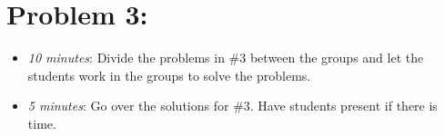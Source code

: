 \documentclass[handout,nooutcomes]{ximera}
\begin{document}
	
	
\section*{Problem 3:}

	\begin{itemize}
	
	\item  \emph{10 minutes}:  Divide the problems in \#3 between the groups and let the students work in the groups to solve the problems.
	
	\item  \emph{5 minutes}:  Go over the solutions for \#3.  Have students present if there is time.
	
	\end{itemize}
	


	
	
	

	
	

	
	
	

	
	
	
\end{document}
